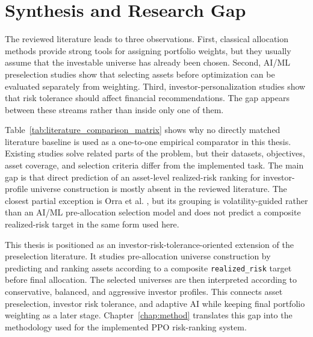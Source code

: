 \section[Synthesis and Research Gap]{Synthesis and Research Gap}

The reviewed literature leads to three observations. First, classical allocation methods provide strong tools for assigning portfolio weights, but they usually assume that the investable universe has already been chosen. Second, AI/ML preselection studies show that selecting assets before optimization can be evaluated separately from weighting. Third, investor-personalization studies show that risk tolerance should affect financial recommendations. The gap appears between these streams rather than inside only one of them.

Table~\ref{tab:literature_comparison_matrix} shows why no directly matched literature baseline is used as a one-to-one empirical comparator in this thesis. Existing studies solve related parts of the problem, but their datasets, objectives, asset coverage, and selection criteria differ from the implemented task. The main gap is that direct prediction of an asset-level realized-risk ranking for investor-profile universe construction is mostly absent in the reviewed literature. The closest partial exception is Orra et al. \cite{orra2025deep}, but its grouping is volatility-guided rather than an AI/ML pre-allocation selection model and does not predict a composite realized-risk target in the same form used here.

This thesis is positioned as an investor-risk-tolerance-oriented extension of the preselection literature. It studies pre-allocation universe construction by predicting and ranking assets according to a composite \texttt{realized\_risk} target before final allocation. The selected universes are then interpreted according to conservative, balanced, and aggressive investor profiles. This connects asset preselection, investor risk tolerance, and adaptive AI while keeping final portfolio weighting as a later stage. Chapter~\ref{chap:method} translates this gap into the methodology used for the implemented PPO risk-ranking system.
